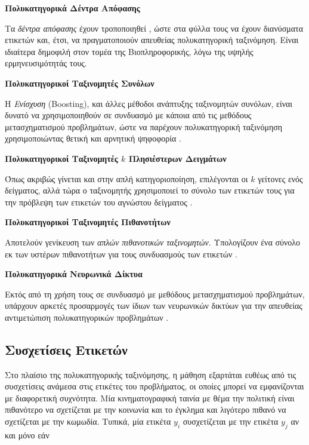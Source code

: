 \begin{description}
\item \textbf{Πολυκατηγορικά Δέντρα Απόφασης}

Τα \textit{δέντρα απόφασης} έχουν τροποποιηθεί \cite{clare2001knowledge}, ώστε στα φύλλα τους να έχουν διανύσματα ετικετών και, έτσι, να πραγματοποιούν απευθείας πολυκατηγορική ταξινόμηση. Είναι ιδιαίτερα δημοφιλή στον τομέα της Βιοπληροφορικής, λόγω της υψηλής ερμηνευσιμότητάς τους.

\item \textbf{Πολυκατηγορικοί Ταξινομητές Συνόλων}

Η \textit{Ενίσχυση} (Boosting), και άλλες μέθοδοι ανάπτυξης ταξινομητών συνόλων, είναι δυνατό να χρησιμοποιηθούν σε συνδυασμό με κάποια από τις μεθόδους μετασχηματισμού προβλημάτων, ώστε να παρέχουν πολυκατηγορική ταξινόμηση χρησιμοποιώντας θετική και αρνητική ψηφοφορία \cite{schapire2000boostexter}. 

\item \textbf{Πολυκατηγορικοί Ταξινομητές $k$ Πλησιέστερων Δειγμάτων}

Όπως ακριβώς γίνεται και στην απλή κατηγοριοποίηση, επιλέγονται οι $k$ γείτονες ενός δείγματος, αλλά τώρα ο ταξινομητής χρησιμοποιεί το σύνολο των ετικετών τους για την πρόβλεψη των ετικετών του αγνώστου δείγματος \cite{zhang2007ml}.

\item \textbf{Πολυκατηγορικοί Ταξινομητές Πιθανοτήτων}

Αποτελούν γενίκευση των \textit{απλών πιθανοτικών ταξινομητών}. Υπολογίζουν ένα σύνολο εκ των υστέρων πιθανοτήτων για τους συνδυασμούς των ετικετών \cite{zhang2010multi}.

\item \textbf{Πολυκατηγορικά Νευρωνικά Δίκτυα}

Εκτός από τη χρήση τους σε συνδυασμό με μεθόδους μετασχηματισμού προβλημάτων, υπάρχουν αρκετές προσαρμογές των ίδιων των νευρωνικών δικτύων για την απευθείας αντιμετώπιση πολυκατηγορικών προβλημάτων \cite{zhang2006}.
\end{description}


\subsection{Συσχετίσεις Ετικετών}
\label{subsect:labelAssociation}
Στο πλαίσιο της πολυκατηγορικής ταξινόμησης, η μάθηση εξαρτάται ευθέως από τις συσχετίσεις ανάμεσα στις ετικέτες του προβλήματος, οι οποίες μπορεί να εμφανίζονται με διαφορετική συχνότητα. Μία κινηματογραφική ταινία με θέμα την πολιτική είναι πιθανότερο να σχετίζεται με την κοινωνία και το έγκλημα και λιγότερο πιθανό να σχετίζεται με την κωμωδία. Τυπικά, μία ετικέτα $y_{i}$ συσχετίζεται με την ετικέτα $y_{j}$ αν και μόνο εάν 


